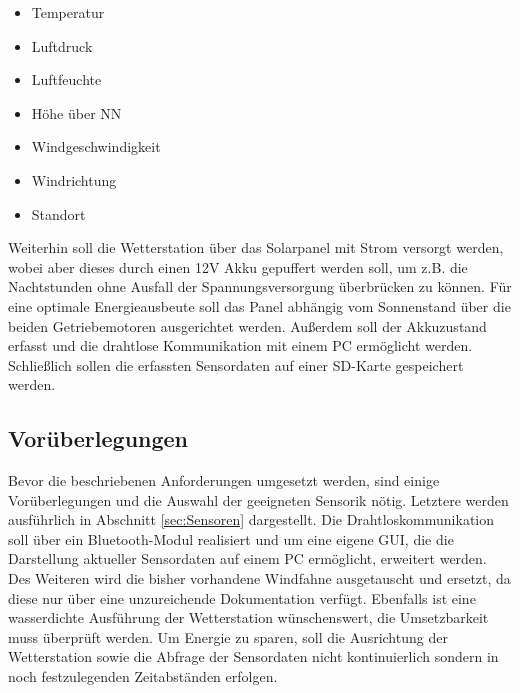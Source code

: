 \begin{itemize}
\item Temperatur
\item Luftdruck
\item Luftfeuchte
\item Höhe über NN
\item Windgeschwindigkeit
\item Windrichtung
\item Standort
\end{itemize}

Weiterhin soll die Wetterstation über das Solarpanel mit Strom versorgt werden, wobei aber dieses durch einen 12V Akku gepuffert werden soll, um z.B. die Nachtstunden ohne Ausfall der Spannungsversorgung überbrücken zu können. Für eine optimale Energieausbeute soll das Panel abhängig vom Sonnenstand über die beiden Getriebemotoren ausgerichtet werden. Außerdem soll der Akkuzustand erfasst und die drahtlose Kommunikation mit einem PC ermöglicht werden. Schließlich sollen die erfassten Sensordaten auf einer SD-Karte gespeichert werden.


\subsection{Vorüberlegungen}\label{subsec:Vorueberlegungen}
Bevor die beschriebenen Anforderungen umgesetzt werden, sind einige Vorüberlegungen und die Auswahl der geeigneten Sensorik nötig. Letztere werden ausführlich in Abschnitt \ref{sec:Sensoren} dargestellt. Die Drahtloskommunikation soll über ein Bluetooth-Modul realisiert und um eine eigene GUI, die die Darstellung aktueller Sensordaten auf einem PC ermöglicht, erweitert werden. Des Weiteren wird die bisher vorhandene Windfahne ausgetauscht und ersetzt, da diese nur über eine unzureichende Dokumentation verfügt.
Ebenfalls ist eine wasserdichte Ausführung der Wetterstation wünschenswert, die Umsetzbarkeit muss überprüft werden. Um Energie zu sparen, soll die Ausrichtung der Wetterstation sowie die Abfrage der Sensordaten nicht kontinuierlich sondern in noch festzulegenden Zeitabständen erfolgen.
